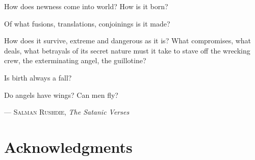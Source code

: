 
\epigraph{How does newness come into world? How is it born?

    Of what fusions, translations, conjoinings is it made?

    How does it survive, extreme and dangerous as it is? What compromises, what deals,
    what betrayals of its secret nature must it take to stave off the wrecking crew, the
    exterminating angel, the guillotine?

    Is birth always a fall?

    Do angels have wings? Can men fly?}{
    --- \textsc{Salman Rushdie}, \textit{The Satanic Verses}}

\bigskip

\begingroup
\let\clearpage\relax
\let\cleardoublepage\relax
\let\cleardoublepage\relax
\chapter*{Acknowledgments}

\endgroup
